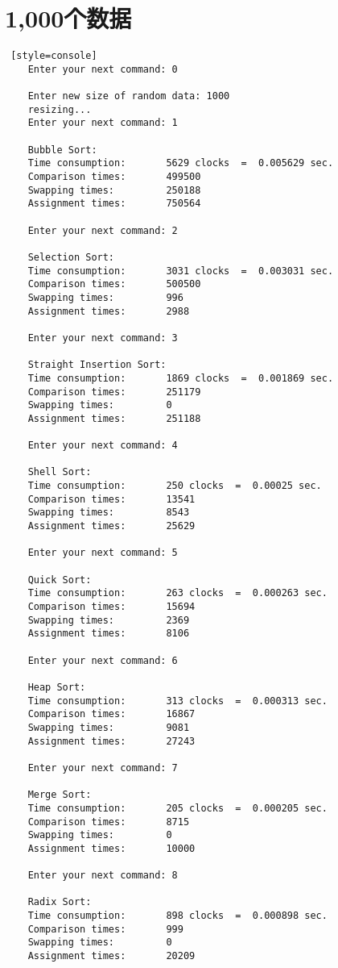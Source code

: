 \section{1,000个数据}
\begin{lstlisting} [style=console]
    Enter your next command: 0

    Enter new size of random data: 1000
    resizing...
    Enter your next command: 1
    
    Bubble Sort:
    Time consumption:		5629 clocks  =  0.005629 sec.
    Comparison times:		499500
    Swapping times:  		250188
    Assignment times:		750564
    
    Enter your next command: 2
    
    Selection Sort:
    Time consumption:		3031 clocks  =  0.003031 sec.
    Comparison times:		500500
    Swapping times:  		996
    Assignment times:		2988
    
    Enter your next command: 3
    
    Straight Insertion Sort:
    Time consumption:		1869 clocks  =  0.001869 sec.
    Comparison times:		251179
    Swapping times:  		0
    Assignment times:		251188
    
    Enter your next command: 4
    
    Shell Sort:
    Time consumption:		250 clocks  =  0.00025 sec.
    Comparison times:		13541
    Swapping times:  		8543
    Assignment times:		25629
    
    Enter your next command: 5
    
    Quick Sort:
    Time consumption:		263 clocks  =  0.000263 sec.
    Comparison times:		15694
    Swapping times:  		2369
    Assignment times:		8106
    
    Enter your next command: 6
    
    Heap Sort:
    Time consumption:		313 clocks  =  0.000313 sec.
    Comparison times:		16867
    Swapping times:  		9081
    Assignment times:		27243
    
    Enter your next command: 7
    
    Merge Sort:
    Time consumption:		205 clocks  =  0.000205 sec.
    Comparison times:		8715
    Swapping times:  		0
    Assignment times:		10000
    
    Enter your next command: 8
    
    Radix Sort:
    Time consumption:		898 clocks  =  0.000898 sec.
    Comparison times:		999
    Swapping times:  		0
    Assignment times:		20209
\end{lstlisting}

